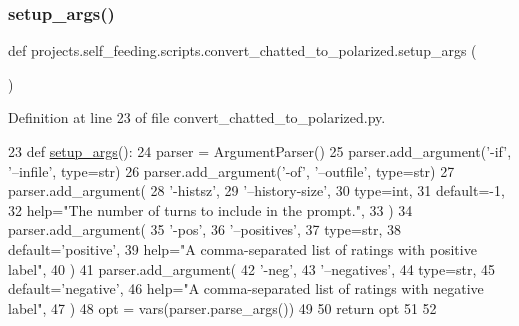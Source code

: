 \mbox{\label{namespaceprojects_1_1self__feeding_1_1scripts_1_1convert__chatted__to__polarized_a573a5263565e2b06291ce92dd3898524}} 
\subsubsection{\texorpdfstring{setup\+\_\+args()}{setup\_args()}}
{\footnotesize\ttfamily def projects.\+self\+\_\+feeding.\+scripts.\+convert\+\_\+chatted\+\_\+to\+\_\+polarized.\+setup\+\_\+args (\begin{DoxyParamCaption}{ }\end{DoxyParamCaption})}



Definition at line 23 of file convert\+\_\+chatted\+\_\+to\+\_\+polarized.\+py.


\begin{DoxyCode}
23 \textcolor{keyword}{def }\hyperlink{namespaceprojects_1_1self__feeding_1_1scripts_1_1convert__chatted__to__polarized_a573a5263565e2b06291ce92dd3898524}{setup\_args}():
24     parser = ArgumentParser()
25     parser.add\_argument(\textcolor{stringliteral}{'-if'}, \textcolor{stringliteral}{'--infile'}, type=str)
26     parser.add\_argument(\textcolor{stringliteral}{'-of'}, \textcolor{stringliteral}{'--outfile'}, type=str)
27     parser.add\_argument(
28         \textcolor{stringliteral}{'-histsz'},
29         \textcolor{stringliteral}{'--history-size'},
30         type=int,
31         default=-1,
32         help=\textcolor{stringliteral}{"The number of turns to include in the prompt."},
33     )
34     parser.add\_argument(
35         \textcolor{stringliteral}{'-pos'},
36         \textcolor{stringliteral}{'--positives'},
37         type=str,
38         default=\textcolor{stringliteral}{'positive'},
39         help=\textcolor{stringliteral}{"A comma-separated list of ratings with positive label"},
40     )
41     parser.add\_argument(
42         \textcolor{stringliteral}{'-neg'},
43         \textcolor{stringliteral}{'--negatives'},
44         type=str,
45         default=\textcolor{stringliteral}{'negative'},
46         help=\textcolor{stringliteral}{"A comma-separated list of ratings with negative label"},
47     )
48     opt = vars(parser.parse\_args())
49 
50     \textcolor{keywordflow}{return} opt
51 
52 
\end{DoxyCode}


